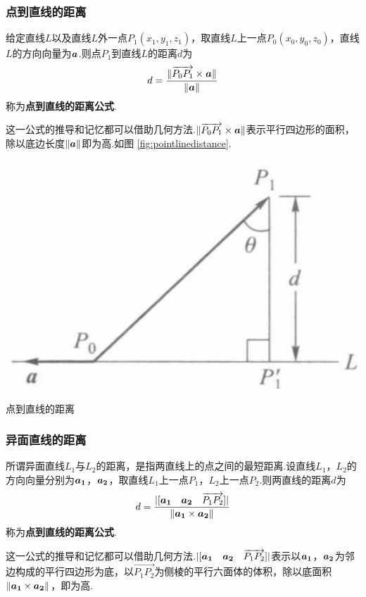 \subsubsection*{点到直线的距离}
\par 给定直线$L$以及直线$L$外一点$P_1(x_1,y_1,z_1)$，取直线$L$上一点$P_0(x_0,y_0,z_0)$，直线$L$的方向向量为$\vb*{a}$.则点$P_1$到直线$L$的距离$d$为
\begin{equation}
  d=\frac{\|\overrightarrow{P_0 P_1} \times \vb*{a}\|}{\|\vb*{a}\|}
\end{equation}
称为\textbf{点到直线的距离公式}.
\begin{remark}
  这一公式的推导和记忆都可以借助几何方法.$\|\overrightarrow{P_0 P_1} \times \vb*{a}\|$表示平行四边形的面积，除以底边长度$\|\vb*{a}\|$即为高.如图 \ref{fig:pointlinedistance}.
\end{remark}

\begin{marginfigure}[7em]
	\includegraphics[width=\marginparwidth]{figures/point-line-distance.jpg}
	\caption{点到直线的距离}
	\label{fig:pointlinedistance}
\end{marginfigure}

\subsubsection*{异面直线的距离}
\par 所谓异面直线$L_1$与$L_2$的距离，是指两直线上的点之间的最短距离.设直线$L_1$，$L_2$的方向向量分别为$\vb*{a_1}$，$\vb*{a_2}$，取直线$L_1$上一点$P_1$，$L_2$上一点$P_2$.则两直线的距离$d$为
\begin{equation}
  d=\frac{|[\vb*{a_1} \quad \vb*{a_2} \quad \overrightarrow{P_1P_2}]|}{\|\vb*{a_1} \times \vb*{a_2}\|}
\end{equation}
称为\textbf{点到直线的距离公式}.
\begin{remark}
  这一公式的推导和记忆都可以借助几何方法.$|[\vb*{a_1} \quad \vb*{a_2} \quad \overrightarrow{P_1P_2}]|$表示以$\vb*{a_1}$，$\vb*{a_2}$为邻边构成的平行四边形为底，以$\overrightarrow{P_1P_2}$为侧棱的平行六面体的体积，除以底面积$\|\vb*{a_1} \times \vb*{a_2}\|$，即为高.
\end{remark}